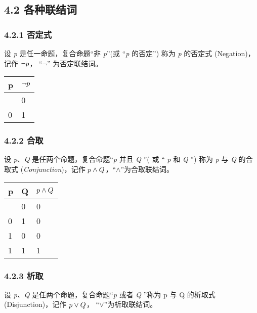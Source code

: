 \subsection{4.2 各种联结词}\label{ux5404ux79cdux8054ux7ed3ux8bcd}

\subsubsection{4.2.1 否定式}\label{ux5426ux5b9aux5f0f}

设 \emph{p} 是任一命题，复合命题``非 \emph{p}''(或 ``\emph{p} 的否定'')
称为 \emph{p} 的否定式 (Negation)，记作 \(\large \lnot p\)，
``\(\lnot\)'' 为否定联结词。

\begin{longtable}[]{@{}ll@{}}
\toprule\noalign{}
p & \(\large \lnot p\) \\
\midrule\noalign{}
\endhead
\bottomrule\noalign{}
\endlastfoot
1 & 0 \\
0 & 1 \\
\end{longtable}

\subsubsection{4.2.2 合取}\label{ux5408ux53d6}

设 \emph{p}、\emph{Q} 是任两个命题，复合命题``\emph{p} 并且 \emph{Q} ''(
或 `` \emph{p} 和 \emph{Q} '') 称为 \emph{p} 与 \emph{Q} 的合取式
(\emph{Conjunction})，记作
\(\large p\land Q\)，``\(\land\)''为合取联结词。

\begin{longtable}[]{@{}lll@{}}
\toprule\noalign{}
p & Q & \(\large p\land Q\) \\
\midrule\noalign{}
\endhead
\bottomrule\noalign{}
\endlastfoot
0 & 0 & 0 \\
0 & 1 & 0 \\
1 & 0 & 0 \\
1 & 1 & 1 \\
\end{longtable}

\subsubsection{4.2.3 析取}\label{ux6790ux53d6}

设 \emph{p、Q} 是任两个命题，复合命题``\emph{p} 或者 \emph{Q} ''称为 p
与 Q 的析取式 (Disjunction)，记作 \(\large p\lor Q\)，
``\(\lor\)''为析取联结词。

